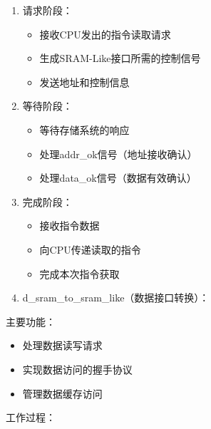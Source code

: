 \begin{enumerate}
\item 请求阶段：
\begin{itemize}
	\item 接收CPU发出的指令读取请求
	\item 生成SRAM-Like接口所需的控制信号
	\item 发送地址和控制信息
\end{itemize}
\item 等待阶段：
\begin{itemize}
	\item 等待存储系统的响应
	\item 处理addr\_ok信号（地址接收确认）
	\item 处理data\_ok信号（数据有效确认）
\end{itemize}
\item 完成阶段：
\begin{itemize}
	\item 接收指令数据
	\item 向CPU传递读取的指令
	\item 完成本次指令获取
\end{itemize}
\item d\_sram\_to\_sram\_like（数据接口转换）：
\end{enumerate}
主要功能：

\begin{itemize}
\item 处理数据读写请求
\item 实现数据访问的握手协议
\item 管理数据缓存访问
\end{itemize}
工作过程：

